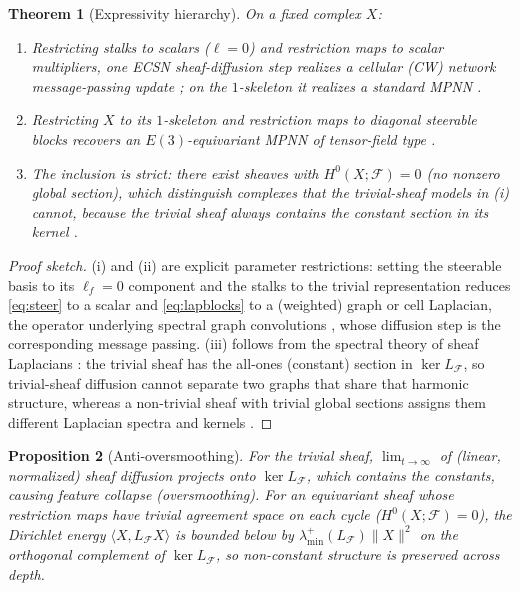 \documentclass[pdflatex,sn-mathphys-num]{sn-jnl}%
\newcommand{\F}{\mathcal{F}}
\newcommand{\X}{X}
\theoremstyle{thmstyleone}
\newtheorem{theorem}{Theorem}[section]
\newtheorem{proposition}[theorem]{Proposition}
\theoremstyle{thmstyletwo}
\theoremstyle{thmstylethree}
\begin{document}
\begin{theorem}[Expressivity hierarchy]\label{thm:express}
On a fixed complex $\X$:
\begin{enumerate}[leftmargin=1.6em,itemsep=1pt]
\item[(i)] Restricting stalks to scalars ($\ell=0$) and restriction maps to
scalar multipliers, one ECSN sheaf-diffusion step realizes a cellular (CW)
network message-passing update \cite{cwn}; on the $1$-skeleton it realizes a
standard MPNN \cite{gilmer2017}.
\item[(ii)] Restricting $\X$ to its $1$-skeleton and restriction maps to diagonal
steerable blocks recovers an $E(3)$-equivariant MPNN of tensor-field type
\cite{tfn,nequip}.
\item[(iii)] The inclusion is strict: there exist sheaves with
$H^0(\X;\F)=0$ (no nonzero global section), which distinguish complexes that the
trivial-sheaf models in (i) cannot, because the trivial sheaf always contains the
constant section in its kernel \cite{bodnar2022}.
\end{enumerate}
\end{theorem}

\begin{proof}[Proof sketch]
(i) and (ii) are explicit parameter restrictions: setting the steerable basis to
its $\ell_f=0$ component and the stalks to the trivial representation reduces
\eqref{eq:steer} to a scalar and \eqref{eq:lapblocks} to a (weighted) graph or
cell Laplacian, the operator underlying spectral graph convolutions \cite{defferrard2016}, whose diffusion step is the corresponding message passing. (iii)
follows from the spectral theory of sheaf Laplacians \cite{hansenghrist2019}: the
trivial sheaf has the all-ones (constant) section in $\ker L_\F$, so trivial-sheaf
diffusion cannot separate two graphs that share that harmonic structure, whereas a
non-trivial sheaf with trivial global sections assigns them different Laplacian
spectra and kernels \cite{bodnar2022}.
\end{proof}

\begin{proposition}[Anti-oversmoothing]\label{prop:smooth}
For the trivial sheaf, $\lim_{t\to\infty}$ of (linear, normalized) sheaf
diffusion projects onto $\ker L_\F$, which contains the constants, causing
feature collapse (oversmoothing). For an equivariant sheaf whose restriction maps
have trivial agreement space on each cycle ($H^0(\X;\F)=0$), the Dirichlet energy
$\langle X,L_\F X\rangle$ is bounded below by $\lambda_{\min}^{+}(L_\F)\|X\|^2$ on
the orthogonal complement of $\ker L_\F$, so non-constant structure is preserved
across depth.
\end{proposition}
\end{document}
